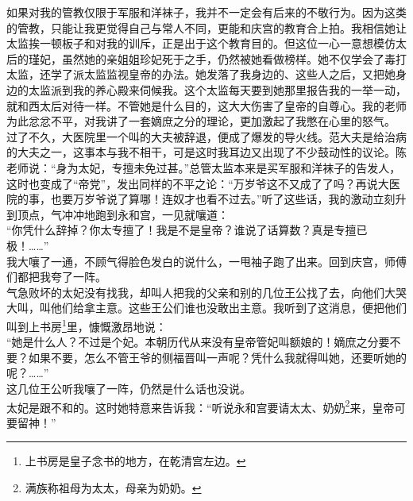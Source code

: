如果对我的管教仅限于军服和洋袜子，我并不一定会有后来的不敬行为。因为这类的管教，只能让我更觉得自己与常人不同，更能和庆宫的教育合上拍。我相信她让太监挨一顿板子和对我的训斥，正是出于这个教育目的。但这位一心一意想模仿太后的瑾妃，虽然她的亲姐姐珍妃死于之手，仍然被她看做榜样。她不仅学会了毒打太监，还学了派太监监视皇帝的办法。她发落了我身边的、这些人之后，又把她身边的太监派到我的养心殿来伺候我。这个太监每天要到她那里报告我的一举一动，就和西太后对待一样。不管她是什么目的，这大大伤害了皇帝的自尊心。我的老师为此忿忿不平，对我讲了一套嫡庶之分的理论，更加激起了我憋在心里的怒气。\\

过了不久，大医院里一个叫的大夫被辞退，便成了爆发的导火线。范大夫是给治病的大夫之一，这事本与我不相干，可是这时我耳边又出现了不少鼓动性的议论。陈老师说：“身为太妃，专擅未免过甚。”总管太监本来是买军服和洋袜子的告发人，这时也变成了“帝党”，发出同样的不平之论：“万岁爷这不又成了了吗？再说大医院的事，也要万岁爷说了算哪！连奴才也看不过去。”听了这些话，我的激动立刻升到顶点，气冲冲地跑到永和宫，一见就嚷道：\\

“你凭什么辞掉？你太专擅了！我是不是皇帝？谁说了话算数？真是专擅已极！……”\\

我大嚷了一通，不顾气得脸色发白的说什么，一甩袖子跑了出来。回到庆宫，师傅们都把我夸了一阵。\\

气急败坏的太妃没有找我，却叫人把我的父亲和别的几位王公找了去，向他们大哭大叫，叫他们给拿主意。这些王公们谁也没敢出主意。我听到了这消息，便把他们叫到上书房\footnote{上书房是皇子念书的地方，在乾清宫左边。}里，慷慨激昂地说：\\

“她是什么人？不过是个妃。本朝历代从来没有皇帝管妃叫额娘的！嫡庶之分要不要？如果不要，怎么不管王爷的侧福晋叫一声呢？凭什么我就得叫她，还要听她的呢？……”\\

这几位王公听我嚷了一阵，仍然是什么话也没说。\\

太妃是跟不和的。这时她特意来告诉我：“听说永和宫要请太太、奶奶\footnote{满族称祖母为太太，母亲为奶奶。}来，皇帝可要留神！”\\

